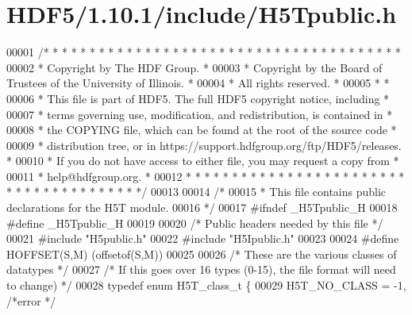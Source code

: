 \hypertarget{_h_d_f5_21_810_81_2include_2_h5_tpublic_8h_source}{}\section{H\+D\+F5/1.10.1/include/\+H5\+Tpublic.h}
\label{_h_d_f5_21_810_81_2include_2_h5_tpublic_8h_source}

\begin{DoxyCode}
00001 \textcolor{comment}{/* * * * * * * * * * * * * * * * * * * * * * * * * * * * * * * * * * * * * * *}
00002 \textcolor{comment}{ * Copyright by The HDF Group.                                               *}
00003 \textcolor{comment}{ * Copyright by the Board of Trustees of the University of Illinois.         *}
00004 \textcolor{comment}{ * All rights reserved.                                                      *}
00005 \textcolor{comment}{ *                                                                           *}
00006 \textcolor{comment}{ * This file is part of HDF5.  The full HDF5 copyright notice, including     *}
00007 \textcolor{comment}{ * terms governing use, modification, and redistribution, is contained in    *}
00008 \textcolor{comment}{ * the COPYING file, which can be found at the root of the source code       *}
00009 \textcolor{comment}{ * distribution tree, or in https://support.hdfgroup.org/ftp/HDF5/releases.  *}
00010 \textcolor{comment}{ * If you do not have access to either file, you may request a copy from     *}
00011 \textcolor{comment}{ * help@hdfgroup.org.                                                        *}
00012 \textcolor{comment}{ * * * * * * * * * * * * * * * * * * * * * * * * * * * * * * * * * * * * * * */}
00013 
00014 \textcolor{comment}{/*}
00015 \textcolor{comment}{ * This file contains public declarations for the H5T module.}
00016 \textcolor{comment}{ */}
00017 \textcolor{preprocessor}{#ifndef \_H5Tpublic\_H}
00018 \textcolor{preprocessor}{#define \_H5Tpublic\_H}
00019 
00020 \textcolor{comment}{/* Public headers needed by this file */}
00021 \textcolor{preprocessor}{#include "H5public.h"}
00022 \textcolor{preprocessor}{#include "H5Ipublic.h"}
00023 
00024 \textcolor{preprocessor}{#define HOFFSET(S,M)    (offsetof(S,M))}
00025 
00026 \textcolor{comment}{/* These are the various classes of datatypes */}
00027 \textcolor{comment}{/* If this goes over 16 types (0-15), the file format will need to change) */}
00028 \textcolor{keyword}{typedef} \textcolor{keyword}{enum} H5T\_class\_t \{
00029     H5T\_NO\_CLASS         = -1,  \textcolor{comment}{/*error                                      */}

\end{DoxyCode}
